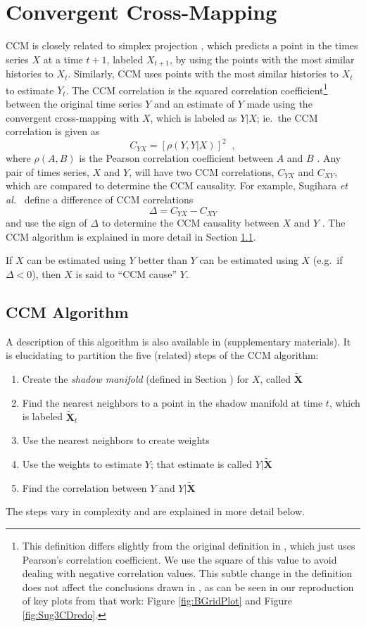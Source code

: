 \documentclass[twocolumn,aps,pre,groupedaddress]{revtex4-1}
\begin{document}
\section{Convergent Cross-Mapping}
CCM is closely related to simplex projection \cite{Sugihara1990,Sugihara1990a}, which predicts a point in the times series $X$ at a time $t+1$, labeled $X_{t+1}$, by using the points with the most similar histories to $X_t$.  Similarly, CCM uses points with the most similar histories to $X_t$ to estimate $Y_t$.  The CCM correlation is the squared correlation coefficient\footnote{This definition differs slightly from the original definition in \cite{Sugihara2012}, which just uses Pearson’s correlation coefficient.  We use the square of this value to avoid dealing with negative correlation values.  This subtle change in the definition does not affect the conclusions drawn in \cite{Sugihara2012}, as can be seen in our reproduction of key plots from that work: Figure \ref{fig:BGridPlot} and Figure \ref{fig:Sug3CDredo}.} between the original time series $Y$ and an estimate of $Y$ made using the convergent cross-mapping with $X$, which is labeled as $Y|X$; ie.\ the CCM correlation is given as 
$$
C_{YX} = \left[\rho\left(Y,Y|X\right)\right]^2\;\;,
$$
where $\rho(A,B)$ is the Pearson correlation coefficient between $A$ and $B$ \cite{}.  Any pair of times series, $X$ and $Y$, will have two CCM correlations, $C_{YX}$ and $C_{XY}$, which are compared to determine the CCM causality.  For example, Sugihara {\em et al.\ }\cite{Sugihara2012} define a difference of CCM correlations
\begin{equation}
\label{eqn:delta}
\Delta = C_{YX} - C_{XY}
\end{equation}
and use the sign of $\Delta$ to determine the CCM causality between $X$ and $Y$ \cite{Sugihara2012}.  The CCM algorithm is explained in more detail in Section \ref{sec:appA}.

If $X$ can be estimated using $Y$ better than $Y$ can be estimated using $X$ (e.g.\ if $\Delta < 0$), then $X$ is said to ``CCM cause'' $Y$.

\subsection{CCM Algorithm}
\label{sec:appA}
A description of this algorithm is also available in \cite{Sugihara2012} (supplementary materials).  It is elucidating to partition the five (related) steps of the CCM algorithm:
\begin{enumerate}
\item Create the {\em shadow manifold} (defined in Section \cite{sec:shadow}) for $X$, called $\tilde{\mathbf{X}}$
\item Find the nearest neighbors to a point in the shadow manifold at time $t$, which is labeled $\tilde{\mathbf{X}}_t$
\item Use the nearest neighbors to create weights
\item Use the weights to estimate $Y$; that estimate is called $Y|\tilde{\mathbf{X}}$
\item Find the correlation between $Y$ and $Y|\tilde{\mathbf{X}}$ 
\end{enumerate}
The steps vary in complexity and are explained in more detail below.
\end{document}
